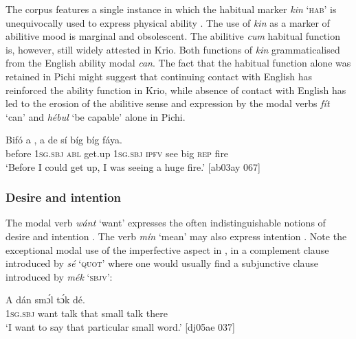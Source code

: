 The corpus features a single instance in which the habitual marker \textit{kin} ‘\textsc{hab}’ is unequivocally used to express physical ability . The use of \textit{kin} as a marker of abilitive mood is marginal and obsolescent. The abilitive \textit{cum} habitual function is, however, still widely attested in Krio. Both functions of \textit{kin} grammaticalised from the English ability modal \textit{can}. The fact that the habitual function alone was retained in Pichi might suggest that continuing contact with English has reinforced the ability function in Krio, while absence of contact with English has led to the erosion of the abilitive sense and expression by the modal verbs \textit{fít} ‘can’ and \textit{hébul} ‘be capable’ alone in Pichi.


\ea%
    \label{ex:key:411}
    \gll Bifó    a      ,  a    de  sí  bíg  bíg  fáya.\\
before  \textsc{1sg.sbj}  \textsc{abl}  get.up  \textsc{1sg.sbj}  \textsc{ipfv}  see  big  \textsc{rep}  fire\\

\glt ‘Before I could get up, I was seeing a huge fire.’ [ab03ay 067]
\z

\subsubsection{Desire and intention}\label{sec:6.7.2.2}

The modal verb \textit{wánt} ‘want’ expresses the often indistinguishable notions of desire and intention . The verb \textit{mín} ‘mean’ may also express intention . Note the exceptional modal use of the imperfective aspect in , in a complement clause introduced by \textit{sé} ‘\textsc{quot}’ where one would usually find a subjunctive clause introduced by \textit{mék} ‘\textsc{sbjv}’:


\ea%
    \label{ex:key:412}
    \gll \MakeUppercase{A}       dán  smɔ́l  tɔ́k  dé.\\
\textsc{1sg.sbj}  want  talk  that  small  talk  there\\

\glt ‘I want to say that particular small word.’ [dj05ae 037]
\z


